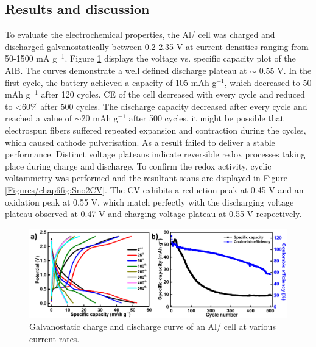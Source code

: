 \subsection{Results and discussion}
To evaluate the electrochemical properties, the Al/ cell was charged and discharged galvanostatically between 0.2-2.35 V at current densities ranging from 50-1500 mA g$^{-1}$. Figure \ref{Figures/chap6fig:SnO2newCDC} displays the voltage vs. specific capacity plot of the AIB. The curves demonstrate a well defined discharge plateau at $\sim$ 0.55 V. In the first cycle, the battery achieved a capacity of 105 mAh g$^{-1}$, which decreased to 50 mAh g$^{-1}$ after 120 cycles. CE of the cell decreased with every cycle and reduced to <60\% after 500 cycles. The discharge capacity decreased after every cycle and reached a value of $\sim$20 mAh g$^{-1}$ after 500 cycles, it might be possible that electrospun fibers suffered repeated expansion and contraction during the cycles, which caused cathode pulverisation. As a result  failed to deliver a stable performance. Distinct voltage plateaus indicate reversible redox processes taking place during charge and discharge. To confirm the redox activity, cyclic voltammetry was performed and the resultant scans are displayed in Figure \ref{Figures/chap6fig:Sno2CV}. The CV exhibits a reduction peak at 0.45 V and an oxidation peak at 0.55 V, which match perfectly with the discharging voltage plateau observed at 0.47 V and charging voltage plateau at 0.55 V respectively.    

 \begin{figure}[th!]
  \centering
  \includegraphics[width=\textwidth]{Figures/chap6fig/SnO2newCDC}
    \caption{Galvanostatic charge and discharge curve of an Al/ cell at various current rates.}
  \label{Figures/chap6fig:SnO2newCDC}
\end{figure}

